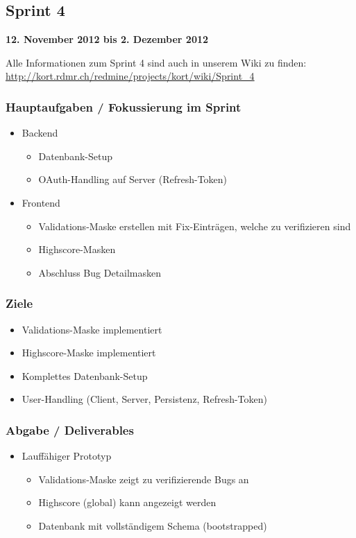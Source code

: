 \subsection{Sprint 4}

\textbf{12. November 2012 bis 2. Dezember 2012}

Alle Informationen zum Sprint 4 sind auch in unserem Wiki zu finden:
\url{http://kort.rdmr.ch/redmine/projects/kort/wiki/Sprint_4}

\subsubsection{Hauptaufgaben / Fokussierung im Sprint}

\begin{itemize}
	\item Backend
	\begin{itemize}
		\item Datenbank-Setup
		\item OAuth-Handling auf Server (Refresh-Token)
	\end{itemize}
	\item Frontend
	\begin{itemize}
		\item Validations-Maske erstellen mit Fix-Einträgen, welche zu verifizieren sind
		\item Highscore-Masken
		\item Abschluss Bug Detailmasken
	\end{itemize}
\end{itemize}

\subsubsection{Ziele}
\begin{itemize}
	\item Validations-Maske implementiert
	\item Highscore-Maske implementiert
	\item Komplettes Datenbank-Setup
	\item User-Handling (Client, Server, Persistenz, Refresh-Token)
\end{itemize}

\subsubsection{Abgabe / Deliverables}

\begin{itemize}
	\item Lauffähiger Prototyp
	\begin{itemize}
		\item Validations-Maske zeigt zu verifizierende Bugs an
		\item Highscore (global) kann angezeigt werden
		\item Datenbank mit vollständigem Schema (bootstrapped)
	\end{itemize}
\end{itemize}


